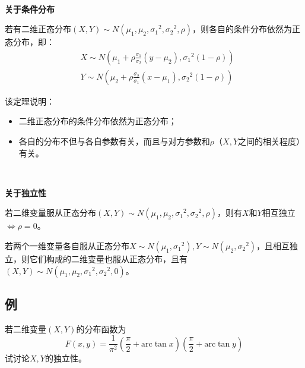 ~

{\bf 关于条件分布}

\begin{theorem}
若有二维正态分布$\left( X,Y \right) \sim N\left( \mu _1,\mu _2,{\sigma _1}^2,{\sigma _2}^2,\rho \right) $，则各自的条件分布依然为正态分布，即：
\begin{align*}
&X\sim N\left( \mu _1+\rho \frac{\sigma _1}{\sigma _2}\left( y-\mu _2 \right) ,{\sigma _1}^2\left( 1-\rho \right) \right) \\
&Y\sim N\left( \mu _2+\rho \frac{\sigma _2}{\sigma _1}\left( x-\mu _1 \right) ,{\sigma _2}^2\left( 1-\rho \right) \right)
\end{align*}
\end{theorem}

该定理说明：
\begin{itemize}
    \item 二维正态分布的条件分布依然为正态分布；
    \item 各自的分布不但与各自参数有关，而且与对方参数和$\rho $（$X,Y$之间的相关程度）有关。
\end{itemize}

~

{\bf 关于独立性}

\begin{theorem}
若二维变量服从正态分布$\left( X,Y \right) \sim N\left( \mu _1,\mu _2,{\sigma _1}^2,{\sigma _2}^2,\rho \right) $，则有$X$和$Y$相互独立$\Leftrightarrow \rho =0$。
\end{theorem}

\begin{theorem}
若两个一维变量各自服从正态分布$X\sim N\left( \mu _1,{\sigma _1}^2 \right) ,Y\sim N\left( \mu _2,{\sigma _2}^2 \right) $，且相互独立，则它们构成的二维变量也服从正态分布，且有$\left( X,Y \right) \sim N\left( \mu _1,\mu _2,{\sigma _1}^2,{\sigma _2}^2,0 \right) $。
\end{theorem}

\subsection{例}

\begin{example}
若二维变量$\left( X,Y \right) $的分布函数为
\[
F\left( x,y \right) =\frac{1}{\pi ^2}\left( \frac{\pi}{2}+\mathrm{arc}\tan x \right) \left( \frac{\pi}{2}+\mathrm{arc}\tan y \right)
\]
试讨论$X,Y$的独立性。
\end{example}

